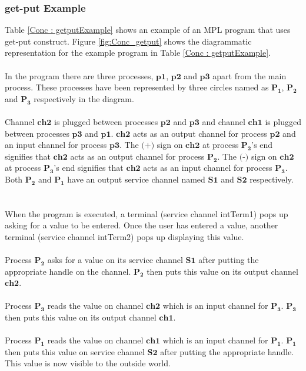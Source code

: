 \documentclass[11pt]{article}
\newcommand{\<}{\langle}
\renewcommand{\>}{\rangle}
\begin{document}
\subsubsection {get-put Example}
Table \ref {Conc : getputExample} shows an example of an MPL program that uses {\sf get-put} construct. Figure \ref {fig:Conc_getput} shows the diagrammatic representation for the example program in Table \ref {Conc : getputExample}.
~~\\~~\\ 
In the program there are three processes, $\mathbf {p1}$, $\mathbf {p2}$ and $\mathbf {p3}$ apart from the main process. These processes have been represented by three circles named as $\mathbf{P_1}$, $\mathbf{P_2}$ and $\mathbf {P_3}$ respectively in the diagram.
~~\\~~\\
Channel $\mathbf {ch2}$ is plugged between processes $\mathbf {p2}$ and $\mathbf {p3}$ and channel $\mathbf {ch1}$ is plugged between processes $\mathbf {p3}$ and $\mathbf {p1}$. $\mathbf {ch2}$ acts as an output channel for process $\mathbf {p2}$ and an input channel for process $\mathbf {p3}$. The $\mathbf {\texttt{(+)}}$ sign on $\mathbf {ch2}$ at process $\mathbf {P_2}$'s end signifies that $\mathbf {ch2}$ acts as an output channel for process $\mathbf {P_2}$. The $\mathbf {\texttt{(-)}}$ sign on $\mathbf {ch2}$ at process $\mathbf {P_3}$'s end signifies that $\mathbf {ch2}$ acts as an input channel for process $\mathbf {P_3}$. Both $\mathbf {P_2}$ and $\mathbf {P_1}$ have an output service channel named $\mathbf {S1}$ and $\mathbf {S2}$ respectively.
~~\\~~\\ 
When the program is executed, a terminal (service channel intTerm1) pops up asking for a value to be entered. Once the user has entered a value, another terminal (service channel intTerm2) pops up displaying this value.
~~\\~~\\ 
Process $\mathbf {P_2}$ asks for a value on its service channel $\mathbf {S1}$ after putting the appropriate handle on the channel. $\mathbf {P_2}$ then puts this value on its output channel $\mathbf {ch2}$.
~~\\~~\\
Process $\mathbf {P_3}$ reads the value on channel $\mathbf {ch2}$ which is an input channel for $\mathbf {P_3}$. $\mathbf {P_3}$ then puts this value on its output channel $\mathbf {ch1}$.
~~\\~~\\ 
Process $\mathbf {P_1}$ reads the value on channel $\mathbf {ch1}$ which is an input channel for $\mathbf {P_1}$. $\mathbf {P_1}$ then puts this value on service channel $\mathbf {S2}$ after putting the appropriate handle. This value is now visible to the outside world.
\end{document}
